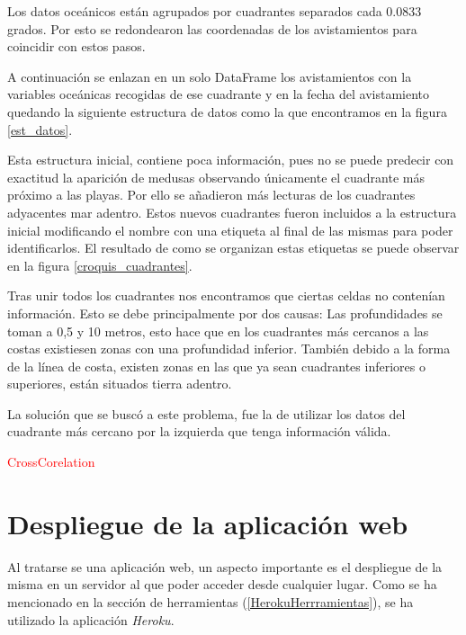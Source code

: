 Los datos oceánicos están agrupados por cuadrantes separados cada \num{0,0833} grados. Por esto se redondearon las coordenadas de los avistamientos para coincidir con estos pasos. 

A continuación se enlazan en un solo DataFrame los avistamientos con la variables oceánicas recogidas de ese cuadrante y en la fecha del avistamiento quedando la siguiente estructura de datos como la que encontramos en la figura \ref{est_datos}.

\label{est_datos}

Esta estructura inicial, contiene poca información, pues no se puede predecir con exactitud la aparición de medusas observando únicamente el cuadrante más próximo a las playas. Por ello se añadieron más lecturas de los cuadrantes adyacentes mar adentro. Estos nuevos cuadrantes fueron incluidos a la estructura inicial modificando el nombre con una etiqueta al final de las mismas para poder identificarlos. El resultado de como se organizan estas etiquetas se puede observar en la figura \ref{croquis_cuadrantes}.

\label{croquis_cuadrantes}

Tras unir todos los cuadrantes nos encontramos que ciertas celdas no contenían información. Esto se debe principalmente por dos causas: Las profundidades se toman a 0,5 y 10 metros, esto hace que en los cuadrantes más cercanos a las costas existiesen zonas con una profundidad inferior. También debido a la forma de la línea de costa, existen zonas en las que ya sean cuadrantes inferiores o superiores, están situados tierra adentro.

La solución que se buscó a este problema, fue la de utilizar los datos del cuadrante más cercano por la izquierda que tenga información válida.

\textcolor{red}{CrossCorelation}

\section{Despliegue de la aplicación web}
Al tratarse se una aplicación web, un aspecto importante es el despliegue de la misma en un servidor al que poder acceder desde cualquier lugar. Como se ha mencionado en la sección de herramientas (\ref{HerokuHerrramientas}), se ha utilizado la aplicación \emph{Heroku}.

